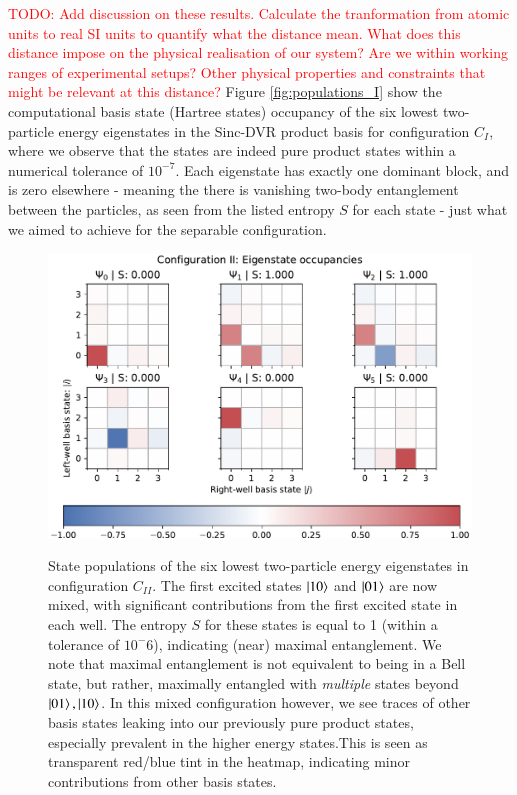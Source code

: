 \documentclass{subfiles}
\begin{document}
\textcolor{red}{TODO: Add discussion on these results. Calculate the tranformation from atomic units to real SI units to quantify what the distance mean. What does this distance impose on the physical realisation of our system? Are we within working ranges of experimental setups? Other physical properties and constraints that might be relevant at this distance?}
Figure \ref{fig:populations_I} show the computational basis state (Hartree states) occupancy of the six lowest two-particle energy eigenstates in the Sinc-DVR product basis for configuration $C_I$, where we observe that the states are indeed pure product states within a numerical tolerance of $10^{-7}$. Each eigenstate has exactly one dominant block, and is zero elsewhere - meaning the there is vanishing two-body entanglement between the particles, as seen from the listed entropy $S$ for each state - just what we aimed to achieve for the separable configuration. 
\\

\begin{figure}[h!]
  \centering
  \includegraphics[width=1.0\textwidth]{figs/state_populations_II.pdf}
  \label{fig:populations_II}
  \caption{State populations of the six lowest two-particle energy eigenstates in configuration $C_{II}$. The first excited states $\ket{10}$ and $\ket{01}$ are now mixed, with significant contributions from the first excited state in each well. The entropy $S$ for these states is equal to 1 (within a tolerance of $10^-6$), indicating (near) maximal entanglement. We note that maximal entanglement is not equivalent to being in a Bell state, but rather, maximally entangled with \emph{multiple} states beyond $\ket{01}, \ket{10}$. In this mixed configuration however, we see traces of other basis states leaking into our previously pure product states, especially prevalent in the higher energy states.This is seen as transparent red/blue tint in the heatmap, indicating minor contributions from other basis states.}
\end{figure}
\end{document}
